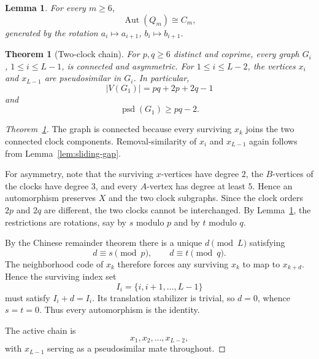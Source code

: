 \documentclass[10pt,a4paper]{amsart}
\newtheorem{lemma}{Lemma}
\newtheorem{theorem}{Theorem}
\newcommand{\Aut}{\operatorname{Aut}}
\newcommand{\psd}{\operatorname{psd}}
\begin{document}
\begin{lemma}\label{lem:clock-aut}
For every $m\ge6$,
\[
    \Aut(Q_m)\cong C_m,
\]
generated by the rotation $a_i\mapsto a_{i+1}$, $b_i\mapsto b_{i+1}$.
\end{lemma}

\begin{theorem}[Two-clock chain]\label{thm:two-clock}
For $p,q\ge6$ distinct and coprime, every graph $G_i$, $1\le i\le L-1$, is connected and asymmetric. For $1\le i\le L-2$, the vertices $x_i$ and $x_{L-1}$ are pseudosimilar in $G_i$. In particular,
\[
    |V(G_1)|=pq+2p+2q-1
\]
and
\[
    \psd(G_1)\ge pq-2.
\]
\end{theorem}

\begin{proof}[Theorem~\ref{thm:two-clock}]
The graph is connected because every surviving $x_k$ joins the two connected clock components. Removal-similarity of $x_i$ and $x_{L-1}$ again follows from Lemma~\ref{lem:sliding-gap}.

For asymmetry, note that the surviving $x$-vertices have degree $2$, the $B$-vertices of the clocks have degree $3$, and every $A$-vertex has degree at least $5$. Hence an automorphism preserves $X$ and the two clock subgraphs. Since the clock orders $2p$ and $2q$ are different, the two clocks cannot be interchanged. By Lemma~\ref{lem:clock-aut}, the restrictions are rotations, say by $s$ modulo $p$ and by $t$ modulo $q$.

By the Chinese remainder theorem there is a unique $d\pmod{L}$ satisfying
\[
    d\equiv s\pmod p,
    \qquad
    d\equiv t\pmod q.
\]
The neighborhood code of $x_k$ therefore forces any surviving $x_k$ to map to $x_{k+d}$. Hence the surviving index set
\[
    I_i=\{i,i+1,\ldots,L-1\}
\]
must satisfy $I_i+d=I_i$. Its translation stabilizer is trivial, so $d=0$, whence $s=t=0$. Thus every automorphism is the identity.

The active chain is
\[
    x_1,x_2,\ldots,x_{L-2},
\]
with $x_{L-1}$ serving as a pseudosimilar mate throughout.
\end{proof}
\end{document}
